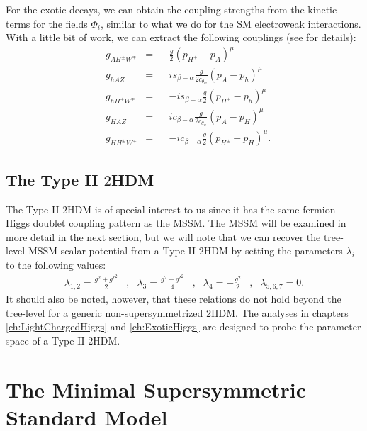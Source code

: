 For the exotic decays, we can obtain the coupling strengths from the kinetic terms for the fields $\Phi_i$, similar to what we do for the SM electroweak interactions. With a little bit of work, we can extract the following couplings (see \citep{Kling:2016yls} for details):
\begin{align*}
& g_{AH^\pm W^\mp} & = && \frac{g}{2}(p_{H^+}-p_{A})^\mu\\
& g_{hAZ}          & = && is_{\beta-\alpha}\frac{g}{2c_{\theta_w}}(p_A-p_h)^\mu\\
& g_{hH^\pm W^\mp} & = && -is_{\beta-\alpha}\frac{g}{2}(p_{H^\pm}-p_h)^\mu\\
& g_{HAZ}          & = && ic_{\beta-\alpha}\frac{g}{2c_{\theta_w}}(p_A-p_H)^\mu\\
& g_{HH^\pm W^\mp} & = && -ic_{\beta-\alpha}\frac{g}{2}(p_{H^\pm}-p_H)^\mu.
\end{align*}

\subsection{The Type II $2$HDM}

The Type II $2$HDM is of special interest to us since it has the same fermion-Higgs doublet coupling pattern as the MSSM. The MSSM will be examined in more detail in the next section, but we will note that we can recover the tree-level MSSM scalar potential from a Type II $2$HDM by setting the parameters $\lambda_i$ to the following values:
\begin{align}
\lambda_{1,2} = \frac{g^2+g'^2}{2} &,& \lambda_3 = \frac{g^2-g'^2}{4} &,& \lambda_4 = -\frac{g^2}{2}&,&\lambda_{5,6,7} = 0.
\end{align}
It should also be noted, however, that these relations do not hold beyond the tree-level for a generic non-supersymmetrized $2$HDM.
The analyses in chapters \ref{ch:LightChargedHiggs} and \ref{ch:ExoticHiggs} are designed to probe the parameter space of a Type II $2$HDM.

\section{The Minimal Supersymmetric Standard Model}\label{sec:supersymmetry}

